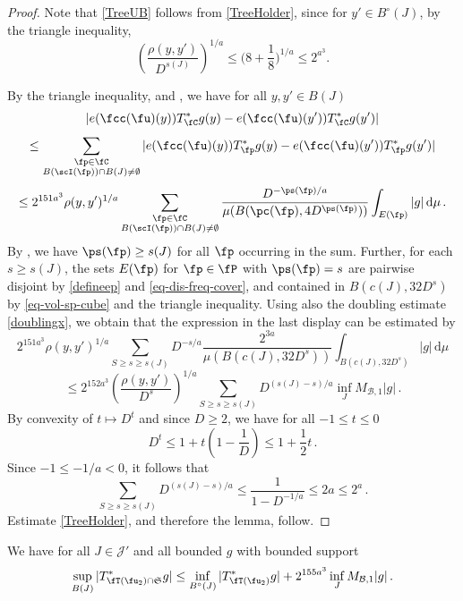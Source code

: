     \begin{proof}
        Note that \eqref{TreeUB} follows from \eqref{TreeHolder}, since for $y'\in B^\circ{}(J)$, by the triangle inequality,
        $$\left(\frac{\rho(y,y')}{D^{s(J)}}\right)^{1/a}\le \Big(8 + \frac{1}8\Big)^{1/a}\le 2^{a^3}.$$

        By the triangle inequality,  and , we have for all $y, y' \in B(J)$
        \begin{equation}
            \label{eq-C-Lip}
            |e(\fcc(\fu)(y)) T_{\fC}^* g(y) - e(\fcc(\fu)(y')) T_{\fC}^* g(y')|
        \end{equation}
        $$
            \leq \sum_{\substack{\fp \in \fC\\ B(\scI(\fp)) \cap B(J) \neq \emptyset}} |e(\fcc(\fu)(y)) T_{\fp}^* g(y) - e(\fcc(\fu)(y')) T_{\fp}^* g(y')|
        $$
        $$
            \le 2^{151a^3}\rho(y,y')^{1/a} \sum_{\substack{\fp \in \fC\\ B(\scI(\fp)) \cap B(J) \neq \emptyset}} \frac{D^{- \ps(\fp)/a}}{\mu(B(\pc(\fp), 4D^{\ps(\fp)}))} \int_{E(\fp)} |g| \, \mathrm{d}\mu\,.
        $$
        By , we have $\ps(\fp) \ge s(J)$ for all $\fp$ occurring in the sum. Further, for each $s \ge s(J)$, the sets $E(\fp)$ for $\fp \in \fP$ with $\ps(\fp) = s$ are pairwise disjoint by \eqref{defineep} and \eqref{eq-dis-freq-cover}, and contained in $B(c(J), 32D^{s})$ by \eqref{eq-vol-sp-cube} and the triangle inequality. Using also the doubling estimate \eqref{doublingx}, we obtain that the expression in the last display can be estimated by
        $$
            2^{151a^3}\rho(y,y')^{1/a} \sum_{S \ge s \ge s(J)} D^{-s/a} \frac{2^{3a}}{\mu(B(c(J), 32D^{s}))} \int_{B(c(J), 32D^{s})} |g| \, \mathrm{d}\mu
        $$
        $$
            \le 2^{152a^3} \left(\frac{\rho(y,y')}{D^s}\right)^{1/a} \sum_{S \ge s \ge s(J)} D^{(s(J) - s)/a} \inf_J M_{\mathcal{B},1} |g|\,.
        $$
        By convexity of $t \mapsto D^t$ and since $D \ge 2$, we have for all $-1 \le t \le 0$
        $$
            D^t \le 1 + t(1 - \frac{1}{D}) \le 1 + \frac{1}{2}t\,.
        $$
        Since $-1 \le -1/a <0$, it follows that
        $$
            \sum_{S \ge s \ge s(J)} D^{(s(J) - s)/a} \le \frac{1}{1 - D^{-1/a}} \le 2a \le 2^a\,.
        $$
        Estimate \eqref{TreeHolder}, and therefore the lemma, follow.
    \end{proof}

    \begin{lemma}
        \label{global-tree-control-2}
        \leanok
        We have for all $J \in \mathcal{J}'$ and all bounded $g$ with bounded support
        $$
            \sup_{B(J)} |T^*_{\fT(\fu_2) \cap \mathfrak{S}} g| \le \inf_{B^\circ{}(J)} |T^*_{\fT(\fu_2)} g| + 2^{155a^3} \inf_{J} M_{\mathcal{B},1}|g|\,.
        $$
    \end{lemma}

